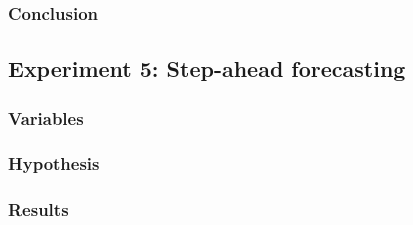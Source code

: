 \subsubsection{Conclusion}



\newpage
\subsection{Experiment 5: Step-ahead forecasting}
\subsubsection{Variables}

\subsubsection{Hypothesis}

\subsubsection{Results}

